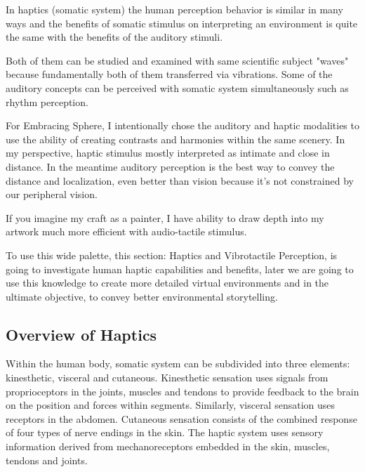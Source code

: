         In haptics (somatic system) the human perception behavior is similar in many ways and the benefits of somatic stimulus on interpreting an environment is quite the same with the benefits of the auditory stimuli\cite{Haptic_Perception-A_Tutorial}.\par

        Both of them can be studied and examined with same scientific subject "waves" because fundamentally both of them transferred via vibrations\cite{Human_Response_to_Vibration}. Some of the auditory concepts can be perceived with somatic system simultaneously such as rhythm perception\cite{Consonance_of_Vibrotactile_Chords}\cite{Composing_Vibrotactile_Music}.\par

        For Embracing Sphere, I intentionally chose the auditory and haptic modalities to use the ability of creating contrasts and harmonies within the same scenery. In my perspective, haptic stimulus mostly interpreted as intimate and close in distance. In the meantime auditory perception is the best way to convey the distance and localization, even better than vision because it's not constrained by our peripheral vision.\par

        If you imagine my craft as a painter, I have ability to draw depth into my artwork much more efficient with audio-tactile stimulus.\par

        To use this wide palette, this section: Haptics and Vibrotactile Perception, is going to investigate human haptic capabilities and benefits, later we are going to use this knowledge to create more detailed virtual environments and in the ultimate objective, to convey better environmental storytelling.\par
        \subsection{Overview of Haptics}
            Within the human body, somatic system can be subdivided into three elements: kinesthetic, visceral and cutaneous. Kinesthetic sensation uses signals from proprioceptors in the joints, muscles and tendons to provide feedback to the brain on the position and forces within segments. Similarly, visceral sensation uses receptors in the abdomen. Cutaneous sensation consists of the combined response of four types of nerve endings in the skin\cite{Human_Response_to_Vibration}. The haptic system uses sensory information derived from mechanoreceptors embedded in the skin, muscles, tendons and joints\cite{Haptic_Perception-A_Tutorial}.\par

